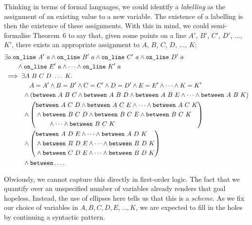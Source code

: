 Thinking in terms of formal languages, we could identify a \emph{labelling} as the assignment of an existing value to a new variable. The existence of a labelling is then the existence of these assignments. With this in mind, we could semi-formalise Theorem~6 to say that, given some points on a line $A'$, $B'$, $C'$, $D'$, $\ldots$, $K'$, there exists an appropriate assignment to $A$, $B$, $C$, $D$, $\ldots$, $K$:
\begin{equation}
  \begin{split}
    &\exists a. \code{on\_line}\ A'\ a\wedge\code{on\_line}\ B'\ a\wedge\code{on\_line}\ C'\ a\wedge\code{on\_line}\ D'\ a\\
    &\qquad\wedge\code{on\_line}\ E'\ a\wedge\cdots\wedge\code{on\_line}\ K'\ a\\
    &\implies\exists A\ B\ C\ D\ \ldots\ K. \\
    &\qquad\qquad A = A' \wedge B = B' \wedge C = C' \wedge D = D' \wedge E = E' \wedge \cdots \wedge K = K'\\
    &\qquad\quad\wedge\left(\between{A}{B}{C} \wedge \between{A}{B}{D} \wedge \between{A}{B}{E} \wedge \cdots \wedge \between{A}{B}{K}\right) \\
    &\qquad\quad\wedge
    \left(\begin{split}&\between{A}{C}{D} \wedge \between{A}{C}{E} \wedge \cdots \wedge \between{A}{C}{K}\\
        &\wedge\between{B}{C}{D} \wedge \between{B}{C}{E} \wedge \between{B}{C}{K}\\
        &\qquad\wedge \cdots \wedge \between{B}{C}{K}
      \end{split}\right)\\  
    &\qquad\quad\wedge
    \left(\begin{split}&\between{A}{D}{E} \wedge \cdots \wedge \between{A}{D}{K} \\
        &\wedge\between{B}{D}{E} \wedge \cdots \wedge \between{B}{D}{K} \\
        &\wedge\between{C}{D}{E} \wedge \cdots \wedge \between{B}{D}{K}
        \end{split}\right)\\
    &\qquad\quad\wedge\code{between}\ldots.
  \end{split}
\end{equation} 

Obviously, we cannot capture this directly in first-order logic. The fact that we quantify over an unspecified number of variables already renders that goal hopeless. Instead, the use of ellipses here tells us that this is a \emph{scheme}. As we fix our choice of variables in $A, B, C, D, E, \ldots, K$, we are expected to fill in the holes by continuing a syntactic pattern.


